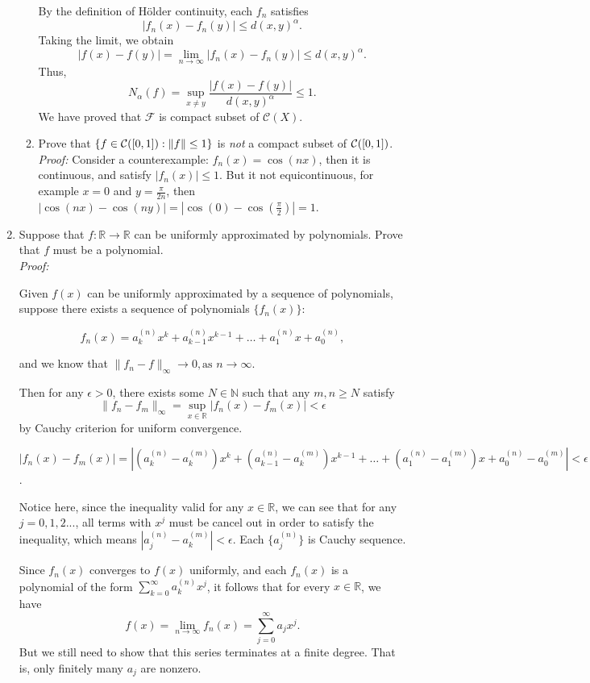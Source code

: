 \documentclass[hidelinks]{article}
\newcommand{\R}{\mathbb R}
\begin{document}
\begin{enumerate}
\begin{enumerate}
By the definition of Hölder continuity, each \( f_n \) satisfies
\[
|f_n(x) - f_n(y)| \leq d(x,y)^\alpha.
\]
Taking the limit, we obtain
\[
|f(x) - f(y)| = \lim_{n \to \infty} |f_n(x) - f_n(y)| \leq d(x,y)^\alpha.
\]
Thus, 
\[
N_\alpha(f) = \sup_{x \neq y} \frac{|f(x) - f(y)|}{d(x,y)^\alpha} \leq 1.
\]
We have proved that $\mathscr{F}$ is compact subset of $\mathcal{C}(X)$.
\item
Prove that $\{f \in {\cal C}([0,1]) : \|f\| \le 1 \}$ is \emph{not} a compact subset of
${\cal C}([0,1])$.
\\

\textit{Proof:}
Consider a counterexample: $f_n(x)=\cos(nx)$, then it is continuous, and satisfy $|f_n(x)|\leq1$. But it not equicontinuous, for example $x=0$ and $y=\frac{\pi}{2n}$, then $|\cos(nx)-\cos(ny)|=|\cos(0)-\cos(\frac{\pi}{2})|=1$.
\end{enumerate}

\item
Suppose that $f: \R\to \R$ can be uniformly approximated by polynomials.
Prove that $f$ must be a polynomial.
\\

\textit{Proof:}

Given \( f(x) \) can be uniformly approximated by a sequence of polynomials, suppose  there exists a sequence of polynomials $\{f_n(x)\}$:

\[
f_n(x) = a_k^{(n)} x^k + a_{k-1}^{(n)} x^{k-1} + \dots + a_1^{(n)} x + a_0^{(n)},
\]

and we know that $\| f_n - f \|_{\infty} \to 0,  \text{as } n \to \infty$.

Then for any $\epsilon>0$, there exists some $N \in \mathbb{N}$ such that any $m,n\geq N$ satisfy 
\[
\| f_n - f_m \|_{\infty} = \sup_{x \in \mathbb{R}} | f_n(x) - f_m(x) |<\epsilon
\]
by Cauchy criterion for uniform convergence.

$|f_n(x)-f_m(x)|=|(a_k^{(n)}-a_k^{(m)}) x^k + (a_{k-1}^{(n)}-a_k^{(m)}) x^{k-1} + \dots + (a_1^{(n)}-a_1^{(m)}) x + a_0^{(n)}-a_0^{(m)}|<\epsilon$.

Notice here, since the inequality valid for any $x\in \mathbb{R}$, we can see that for any $j=0,1,2...$, all terms with $x^{j}$ must be cancel out in order to satisfy the inequality, which means $|a_j^{(n)}-a_k^{(m)}|<\epsilon$. Each $\{a_j^{(n)}\}$ is Cauchy sequence.

Since $f_n(x) $ converges to $ f(x)$ uniformly, and each $f_n(x)$ is a polynomial of the form $\sum_{k=0}^\infty a_k^{(n)} x^j$, it follows that for every $x \in \mathbb{R}$, we have
\[
f(x) = \lim_{n \to \infty} f_n(x) = \sum_{j=0}^{\infty} a_j x^j.
\]
But we still need to show that this series terminates at a finite degree. That is, only finitely many $a_j$ are nonzero.


\end{enumerate}
\end{document}
